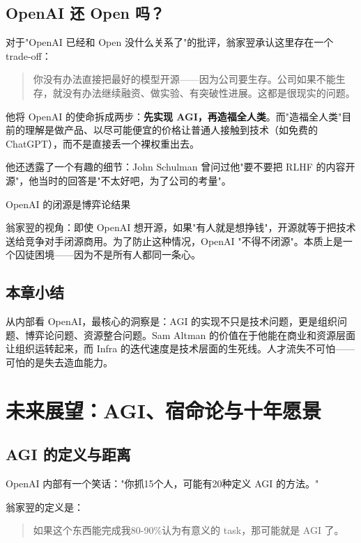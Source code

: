 \documentclass[a4paper]{article}
\begin{document}
\subsection{OpenAI 还 Open 吗？}

对于"OpenAI 已经和 Open 没什么关系了"的批评，翁家翌承认这里存在一个 trade-off：

\begin{quote}
你没有办法直接把最好的模型开源——因为公司要生存。公司如果不能生存，就没有办法继续融资、做实验、有突破性进展。这都是很现实的问题。
\end{quote}

他将 OpenAI 的使命拆成两步：\textbf{先实现 AGI，再造福全人类}。而"造福全人类"目前的理解是做产品、以尽可能便宜的价格让普通人接触到技术（如免费的 ChatGPT），而不是直接丢一个裸权重出去。

他还透露了一个有趣的细节：John Schulman 曾问过他"要不要把 RLHF 的内容开源"，他当时的回答是"不太好吧，为了公司的考量"。

\begin{warningbox}{OpenAI 的闭源是博弈论结果}

翁家翌的视角：即使 OpenAI 想开源，如果"有人就是想挣钱"，开源就等于把技术送给竞争对手闭源商用。为了防止这种情况，OpenAI "不得不闭源"。本质上是一个囚徒困境——因为不是所有人都同一条心。
\end{warningbox}


\subsection{本章小结}
从内部看 OpenAI，最核心的洞察是：AGI 的实现不只是技术问题，更是组织问题、博弈论问题、资源整合问题。Sam Altman 的价值在于他能在商业和资源层面让组织运转起来，而 Infra 的迭代速度是技术层面的生死线。人才流失不可怕——可怕的是失去造血能力。

\section{未来展望：AGI、宿命论与十年愿景}

\subsection{AGI 的定义与距离}

OpenAI 内部有一个笑话："你抓15个人，可能有20种定义 AGI 的方法。"

翁家翌的定义是：

\begin{quote}
如果这个东西能完成我80-90\%认为有意义的 task，那可能就是 AGI 了。
\end{quote}
\end{document}
